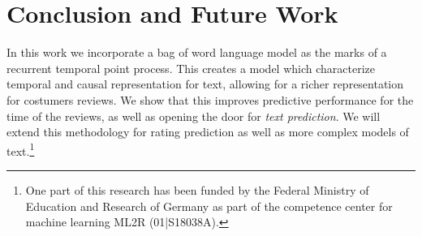 \documentclass[letterpaper]{article} %
\newcommand{\+}[1]{\boldsymbol{\mathbf{#1}}}
\begin{document}
\section{Conclusion and Future Work}
In this work we incorporate a bag of word language model as the marks of a recurrent temporal point process. This creates a model which characterize temporal and causal representation for text, allowing for a richer representation for costumers reviews. We show that this improves predictive performance for the time of the reviews, as well as opening the door for \textit{text prediction}. We will extend this methodology for rating prediction as well as more complex models of text.\footnote{One part of this research has been funded by the Federal Ministry of Education and Research of Germany as part of the competence center for machine learning ML2R (01|S18038A).}


\end{document}
